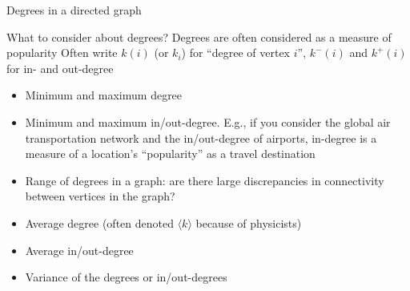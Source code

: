 \documentclass[aspectratio=169]{beamer}\usepackage[]{graphicx}\usepackage[]{xcolor}
\begin{document}
\begin{frame}{Degrees in a directed graph}
\begin{minipage}{0.45\textwidth}
		\end{minipage}
\end{frame}


\begin{frame}{What to consider about degrees?}
	Degrees are often considered as a measure of popularity
	\vfill
	Often write $k(i)$ (or $k_i$) for ``degree of vertex $i$'', $k^-(i)$ and $k^+(i)$ for in- and out-degree
	\vfill
	\begin{itemize}
		\item Minimum and maximum degree
		\item Minimum and maximum in/out-degree. E.g., if you consider the global air transportation network and the in/out-degree of airports, in-degree is a measure of a location's ``popularity'' as a travel destination
		\item Range of degrees in a graph: are there large discrepancies in connectivity between vertices in the graph?
		\item Average degree (often denoted $\langle k\rangle$ because of physicists)
		\item Average in/out-degree
		\item Variance of the degrees or in/out-degrees
	\end{itemize}
\end{frame}
\end{document}
